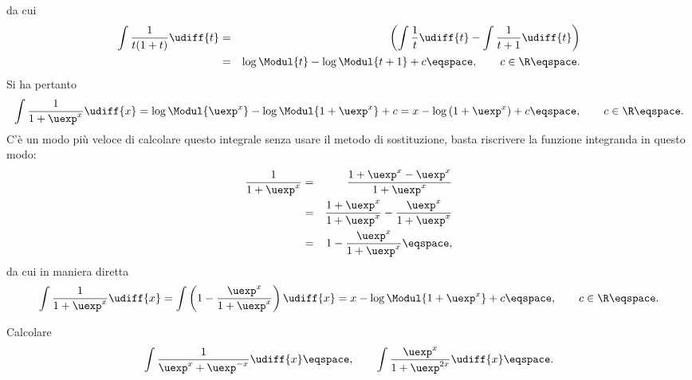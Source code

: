 \begin{Solution}
\begin{displaymath}
\end{displaymath}
 da cui 
\begin{eqnarray*}
\int \frac{1}{t(1+t)} \udiff{t} &=& \left( \int \frac{1}{t}
\udiff{t} - \int \frac{1}{t+1} \udiff{t} \right) \\
&=& \log \Modul{t} - \log \Modul{t+1} + c \eqspace, \qquad c\in\R
\eqspace .
\end{eqnarray*}
Si ha pertanto
\begin{displaymath}
\int \frac{1}{1+\uexp^{x}} \udiff{x} = \log \Modul{\uexp^{x}} - \log \Modul{1+
\uexp^{x}} + c = x - \log \left( 1+ \uexp^{x} \right) + c\eqspace, \qquad c
\in\R \eqspace .
\end{displaymath}
C'\`e un modo pi\`u veloce di calcolare questo integrale senza usare il metodo
di sostituzione, basta riscrivere la funzione integranda in questo modo:
\begin{eqnarray*}
\frac{1}{1+\uexp^{x}} &=& \frac{1 +\uexp^{x} - \uexp^{x}}{1+\uexp^{x} } \\
&=& \frac{1+ \uexp^{x}}{1+ \uexp^{x}} - \frac{\uexp^{x}}{1+\uexp^{x}} \\
&=& 1 - \frac{\uexp^{x}}{1+\uexp^{x}} \eqspace, 
\end{eqnarray*}
da cui in maniera diretta 
\begin{displaymath}
\int\frac{1}{1+\uexp^{x}} \udiff{x} = \int \left( 1 -
\frac{\uexp^{x}}{1+\uexp^{x}} \right) \udiff{x} = x - \log \Modul{1+\uexp^{x}} +
c\eqspace, \qquad c\in\R\eqspace .
\end{displaymath}
\end{Solution}
\begin{Exercise}
Calcolare
\begin{displaymath}
\int \frac{1}{\uexp^{x} + \uexp^{-x}} \udiff{x}  \eqspace, \qquad 
\int \frac{\uexp^{x}}{1+\uexp^{2x}} \udiff{x}
\eqspace .
\end{displaymath}
\end{Exercise}
